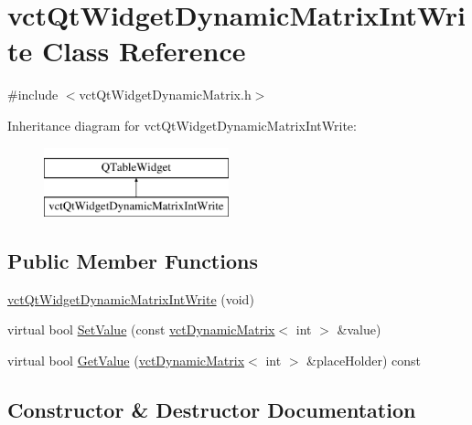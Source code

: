 \hypertarget{classvct_qt_widget_dynamic_matrix_int_write}{}\section{vct\+Qt\+Widget\+Dynamic\+Matrix\+Int\+Write Class Reference}
\label{classvct_qt_widget_dynamic_matrix_int_write}


{\ttfamily \#include $<$vct\+Qt\+Widget\+Dynamic\+Matrix.\+h$>$}

Inheritance diagram for vct\+Qt\+Widget\+Dynamic\+Matrix\+Int\+Write\+:\begin{figure}[H]
\begin{center}
\leavevmode
\includegraphics[height=2.000000cm]{d4/d7e/classvct_qt_widget_dynamic_matrix_int_write}
\end{center}
\end{figure}
\subsection*{Public Member Functions}
\begin{DoxyCompactItemize}
\item 
\hyperlink{classvct_qt_widget_dynamic_matrix_int_write_af71f8af7e13bdbbb1add5db17ee9470e}{vct\+Qt\+Widget\+Dynamic\+Matrix\+Int\+Write} (void)
\item 
virtual bool \hyperlink{classvct_qt_widget_dynamic_matrix_int_write_ad18acbd30a806875758bd4ab67442827}{Set\+Value} (const \hyperlink{classvct_dynamic_matrix}{vct\+Dynamic\+Matrix}$<$ int $>$ \&value)
\item 
virtual bool \hyperlink{classvct_qt_widget_dynamic_matrix_int_write_a5f62159b658d1246508745b17699795f}{Get\+Value} (\hyperlink{classvct_dynamic_matrix}{vct\+Dynamic\+Matrix}$<$ int $>$ \&place\+Holder) const 
\end{DoxyCompactItemize}


\subsection{Constructor \& Destructor Documentation}
\hypertarget{classvct_qt_widget_dynamic_matrix_int_write_af71f8af7e13bdbbb1add5db17ee9470e}{}
